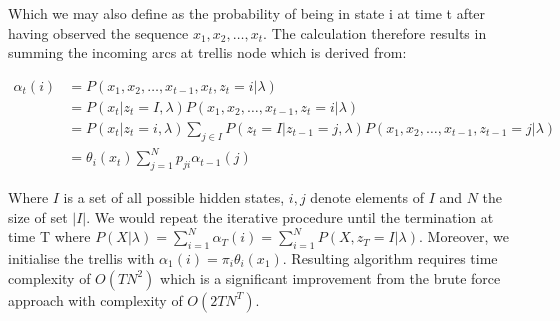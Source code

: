 Which we may also define as the probability of being in state i at time t after having observed the sequence ${x_1,x_2,\ldots,x_t}$. The calculation therefore results in summing the incoming arcs at trellis node which is derived from:

\begin{align}
\alpha_t(i) &= P(x_1,x_2,\ldots,x_{t-1},x_t,z_t=i |\lambda) \\ \nonumber
&= P(x_t|z_t=I, \lambda) P(x_1,x_2,\ldots,x_{t-1},z_t=i |\lambda)  \\ \nonumber
&= P(x_t|z_t=i, \lambda) \sum_{j \in I} P(z_t = I| z_{t-1}=j,\lambda) P(x_1,x_2,\ldots,x_{t-1},z_{t-1}=j |\lambda) \\ \nonumber
&= \theta_i(x_t) \sum_{j=1}^N p_{ji} \alpha_{t-1}(j)
\end{align}

Where $I$ is a set of all possible hidden states, $i,j$ denote elements of $I$ and $N$ the size of set $|I|$. We would repeat the iterative procedure until the termination at time T where $P(X|\lambda) = \sum_{i=1}^N  \alpha_T(i) = \sum_{i=1}^N P(X,z_T=I|\lambda)$. Moreover, we initialise the trellis with $\alpha_1(i)=\pi_i \theta_i(x_1)$. Resulting algorithm requires time complexity of $O(TN^2)$ which is a significant improvement from the brute force approach with complexity of $O(2TN^T)$.
  

